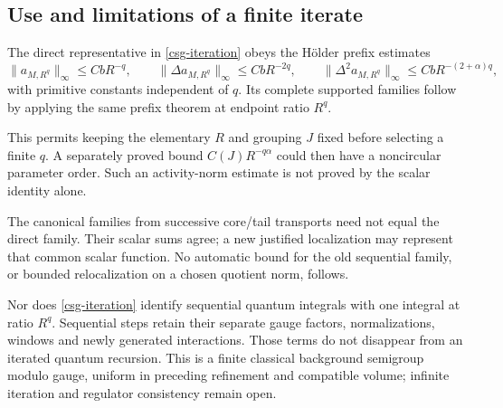 \subsection{Use and limitations of a finite iterate}
\label{csg-scope-section}

The direct representative in \eqref{csg-iteration} obeys
the H\"older prefix estimates
\begin{equation}
 \|a_{M,R^q}\|_\infty\le CbR^{-q},\qquad
 \|\Delta a_{M,R^q}\|_\infty\le CbR^{-2q},\qquad
 \|\Delta^2a_{M,R^q}\|_\infty
                         \le CbR^{-(2+\alpha)q},
 \label{csg-iterated-scales}
\end{equation}
with primitive constants independent of $q$. Its complete
supported families follow by applying the same prefix
theorem at endpoint ratio $R^q$.

This permits keeping the elementary $R$ and grouping $J$
fixed before selecting a finite $q$. A separately proved
bound $C(J)R^{-q\alpha}$ could then have a noncircular
parameter order. Such an activity-norm estimate is not
proved by the scalar identity alone.

The canonical families from successive core/tail
transports need not equal the direct family. Their scalar
sums agree; a new justified localization may represent
that common scalar function. No automatic bound for the
old sequential family, or bounded relocalization on a
chosen quotient norm, follows.

Nor does \eqref{csg-iteration} identify sequential quantum
integrals with one integral at ratio $R^q$. Sequential
steps retain their separate gauge factors, normalizations,
windows and newly generated interactions. Those terms do
not disappear from an iterated quantum recursion. This
is a finite classical background semigroup modulo gauge,
uniform in preceding refinement and compatible volume;
infinite iteration and regulator consistency remain open.
